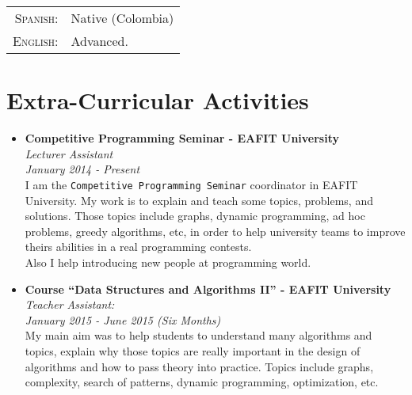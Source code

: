 \documentclass[a4paper,10pt]{article} %
\begin{document}
\begin{tabular}{rl}
\textsc{Spanish:} & Native (Colombia)\\
\textsc{English:} & Advanced.\\
\end{tabular}


\section{Extra-Curricular Activities}
\begin{itemize}
\item \textbf{Competitive Programming Seminar - EAFIT University}\\
\textit{Lecturer Assistant}\\
\textit{January 2014 - Present}\\
I am the \texttt{Competitive Programming Seminar} coordinator in EAFIT University. My work is to explain and teach some topics, problems, and solutions. Those topics include graphs, dynamic programming, ad hoc problems, greedy algorithms, etc, in order to help university teams to improve theirs abilities in a real programming contests.\\
Also I help introducing new people at programming world.
\item \textbf{Course ``Data Structures and Algorithms II'' - EAFIT University}\\
\textit{Teacher Assistant:}\\
\textit{January 2015 - June 2015 (Six Months)}\\
My main aim was to help students to understand many algorithms and topics, explain why those topics are really important in the design of algorithms and how to pass theory into practice. Topics include graphs, complexity, search of patterns, dynamic programming, optimization, etc.\\
\end{itemize}

\end{document}
